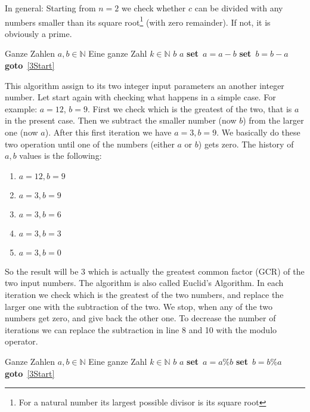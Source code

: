 \documentclass{article}[12pt]
\newcommand{\SET}{\textbf{set}\ }
\newcommand{\GOTO}{\textbf{goto}\ }
\begin{document}
In general: Starting from $n=2$ we check whether $c$ can be divided with any numbers smaller than its square root\footnote{For a natural number its
largest possible divisor is its square root} (with zero remainder). If not, it is obviously a prime.

\begin{algorithm}[H]
\caption{}
\begin{algorithmic}[1]
\REQUIRE Ganze Zahlen $a,b\in\mathbb{N}$
\ENSURE Eine ganze Zahl $k\in\mathbb{N}$
\RETURN $b$
\ENDIF
{} \label{3Start}
\RETURN $a$
\ENDIF
{}
\STATE \SET $a = a - b$
\ELSE 
\STATE \SET $b = b - a$
\ENDIF
\STATE \GOTO \ref{3Start}
\end{algorithmic}
\end{algorithm} 
This algorithm assign to its two integer input parameters an another integer number. Let start again with checking what happens in 
a simple case. For example: $a=12$, $b=9$. First we check which is the greatest of the two, that is $a$ in the present case. Then we 
subtract the smaller number (now $b$) from the larger one (now $a$). After this first iteration we have $a=3,b=9$. We basically
do these two operation until one of the numbers (either $a$ or $b$) gets zero. The history of $a,b$ values is the following:
\begin{enumerate}
\item $a=12, b=9$
\item $a= 3, b=9$
\item $a= 3, b=6$
\item $a= 3, b=3$
\item $a= 3, b=0$
\end{enumerate} 
So the result will be $3$ which is actually the greatest common factor (GCR) of the two input numbers. The algorithm 
is also called Euclid's Algorithm. In each iteration we check which is the greatest of the two numbers, and replace
the larger one with the subtraction of the two. We stop, when any of the two numbers get zero, and give back the other one.
To decrease the number of iterations we can replace the subtraction in line 8 and 10 with the modulo operator.
\begin{algorithm}[H]
\caption{}
\begin{algorithmic}[1]
\REQUIRE Ganze Zahlen $a,b\in\mathbb{N}$
\ENSURE Eine ganze Zahl $k\in\mathbb{N}$
\RETURN $b$
\ENDIF
{} \label{3Start}
\RETURN $a$
\ENDIF
{}
\STATE \SET $a = a \% b$
\ELSE
\STATE \SET $b = b \% a$
\ENDIF
\STATE \GOTO \ref{3Start}
\end{algorithmic}
\end{algorithm}
\end{document}
